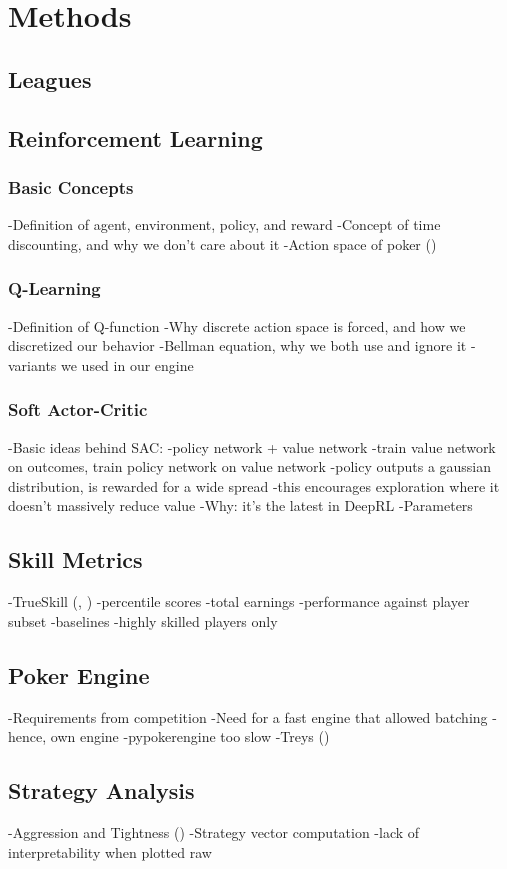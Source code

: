 \chapter{Methods}

\section{Leagues}

\section{Reinforcement Learning}
\subsection{Basic Concepts}
-Definition of agent, environment, policy, and reward
-Concept of time discounting, and why we don't care about it
-Action space of poker
(\cite{SpinningUp2018})

\subsection{Q-Learning}
-Definition of Q-function
-Why discrete action space is forced, and how we discretized our behavior
-Bellman equation, why we both use and ignore it
-variants we used in our engine

\subsection{Soft Actor-Critic}
\cite{SAC_main}
-Basic ideas behind SAC:
    -policy network + value network
    -train value network on outcomes, train policy network on value network
    -policy outputs a gaussian distribution, is rewarded for a wide spread
    -this encourages exploration where it doesn't massively reduce value
-Why: it's the latest in DeepRL
-Parameters

\section{Skill Metrics}
-TrueSkill (\cite{TrueSkill_original}, \cite{TrueSkill_blog})
-percentile scores
-total earnings
-performance against player subset
    -baselines
    -highly skilled players only

\section{Poker Engine}
-Requirements from competition
-Need for a fast engine that allowed batching
    -hence, own engine
-pypokerengine too slow
-Treys (\cite{Treys})
\section{Strategy Analysis}
-Aggression and Tightness (\cite{PokerStrategy})
-Strategy vector computation
    -lack of interpretability when plotted raw